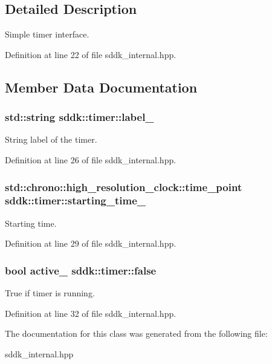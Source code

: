 \subsection{Detailed Description}
Simple timer interface. 

Definition at line 22 of file sddk\+\_\+internal.\+hpp.



\subsection{Member Data Documentation}
\hypertarget{classsddk_1_1timer_a78daa1e180d40695082fb541b209c1ac}{}
\subsubsection[{label\+\_\+}]{\setlength{\rightskip}{0pt plus 5cm}std\+::string sddk\+::timer\+::label\+\_\+\hspace{0.3cm}{\ttfamily [private]}}\label{classsddk_1_1timer_a78daa1e180d40695082fb541b209c1ac}


String label of the timer. 



Definition at line 26 of file sddk\+\_\+internal.\+hpp.

\hypertarget{classsddk_1_1timer_a5f2db64ecb12bc8cee0038e45aecfb66}{}
\subsubsection[{starting\+\_\+time\+\_\+}]{\setlength{\rightskip}{0pt plus 5cm}std\+::chrono\+::high\+\_\+resolution\+\_\+clock\+::time\+\_\+point sddk\+::timer\+::starting\+\_\+time\+\_\+\hspace{0.3cm}{\ttfamily [private]}}\label{classsddk_1_1timer_a5f2db64ecb12bc8cee0038e45aecfb66}


Starting time. 



Definition at line 29 of file sddk\+\_\+internal.\+hpp.

\hypertarget{classsddk_1_1timer_a66ae4b2bda5dc90b0e68ae5e1f2c8fae}{}
\subsubsection[{false}]{\setlength{\rightskip}{0pt plus 5cm}bool active\+\_\+ sddk\+::timer\+::false\hspace{0.3cm}{\ttfamily [private]}}\label{classsddk_1_1timer_a66ae4b2bda5dc90b0e68ae5e1f2c8fae}


True if timer is running. 



Definition at line 32 of file sddk\+\_\+internal.\+hpp.



The documentation for this class was generated from the following file\+:\begin{DoxyCompactItemize}
\item 
sddk\+\_\+internal.\+hpp\end{DoxyCompactItemize}
